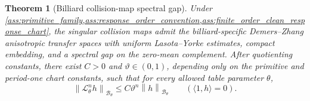\documentclass[11pt]{amsart}
\theoremstyle{compactplain}
\newtheorem{theorem}{Theorem}[section]
\theoremstyle{compactdefinition}
\theoremstyle{compactremark}
\newcommand{\Bcal}{\mathcal B}
\newcommand{\Ltransfer}{\mathscr L}
\newcommand{\norm}[1]{\left\lVert#1\right\rVert}
\begin{document}
\begin{theorem}[Billiard collision-map spectral gap]
\label{thm:primitive_spectral_resolvent}
Under
\cref{ass:primitive_family,ass:response_order_convention,ass:finite_order_clean_response_chart},
the singular collision maps admit the billiard-specific Demers--Zhang
anisotropic transfer spaces with uniform Lasota--Yorke estimates, compact
embedding, and a spectral gap on the zero-mean complement.  After quotienting
constants, there exist \(C>0\) and \(\vartheta\in(0,1)\), depending only on
the primitive and period-one chart constants, such that for every
allowed table parameter $\theta$,
\begin{equation}
  \norm{\Ltransfer_\theta^n h}_{\Bcal_\theta}
  \le C\vartheta^n\norm{h}_{\Bcal_\theta}
  \qquad (\langle 1,h\rangle=0).
\end{equation}
\end{theorem}
\end{document}

